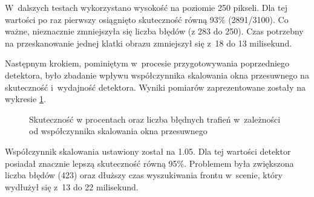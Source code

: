 W~dalszych testach wykorzystano wysokość na poziomie 250 pikseli. 
Dla tej wartości po raz pierwszy osiągnięto skuteczność równą 93\% (2891/3100).
Co ważne, nieznacznie zmniejszyła się liczba błędów (z 283 do 250). 
Czas potrzebny na przeskanowanie jednej klatki obrazu
zmniejszył się z~18 do 13 milisekund.

Następnym krokiem, pominiętym w~procesie przygotowywania poprzedniego
detektora, było zbadanie wpływu współczynnika skalowania okna przesuwnego
na skuteczność i~wydajność detektora. Wyniki pomiarów zaprezentowane
zostały na wykresie \ref{chart:scale_factor2hitratio}.

\begin{figure}[h!]
	\centering
	\begin{subfigure}{.49\linewidth}\centering
	\end{subfigure}
	\hfill
	\begin{subfigure}{.49\linewidth}\centering
	\end{subfigure}
	\caption{Skuteczność w procentach oraz liczba błędnych trafień 
		w~zależności od współczynnika skalowania okna przesuwnego}
	\label{chart:scale_factor2hitratio}
\end{figure}

Współczynnik skalowania ustawiony został na 1.05. Dla tej wartości
detektor posiadał znacznie lepszą skuteczność równą 95\%. Problemem była 
zwiększona liczba błędów (423) oraz dłuższy czas wyszukiwania frontu w~scenie, 
który wydłużył się z~13 do 22 milisekund.

